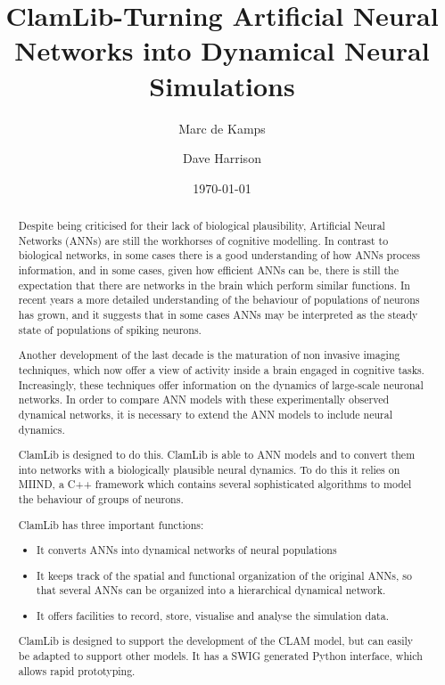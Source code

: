 \documentclass[11pt]{article}
\begin{document}
\lstset{language=C++,basicstyle=\tiny}

\title{ClamLib-Turning Artificial Neural Networks into Dynamical Neural Simulations}

\author{Marc de Kamps \and Dave Harrison}
\date{\today}

\maketitle
\begin{abstract}
Despite being criticised for their lack of biological plausibility, Artificial Neural Networks (ANNs) are still the workhorses of cognitive modelling. In contrast to biological networks, in some cases there is a good understanding of how ANNs process information, and in some cases, given how efficient ANNs can be, there is still the expectation that there are networks in the brain which perform similar functions. In recent years a more detailed understanding of the behaviour of populations of neurons has grown, and it suggests that in some cases ANNs may be interpreted as the steady state of populations of spiking neurons.

Another development of the last decade is the maturation of non invasive imaging techniques, which now offer a view of activity inside a brain engaged in cognitive tasks. Increasingly, these techniques offer information on the dynamics of large-scale neuronal networks. In order to compare ANN models with these experimentally observed dynamical networks, it is necessary to extend the ANN models to include neural dynamics.

ClamLib is designed to do this. ClamLib is able to ANN models and to convert them into networks with a biologically plausible neural dynamics. To do this it relies on MIIND, a C++ framework which contains several sophisticated algorithms to model the behaviour of groups of neurons.

ClamLib has three important functions:
\begin{itemize}
\item It converts ANNs into dynamical networks of neural populations
\item It keeps track of the spatial and functional organization of the original ANNs, so that several ANNs can be organized into a hierarchical dynamical network.
\item It offers facilities to record, store, visualise and analyse the simulation data.
\end{itemize}
ClamLib is designed to support the development of the CLAM model, but can easily be adapted to support other models. It has a SWIG generated Python interface, which allows rapid prototyping.
\end{abstract}
\end{document}
